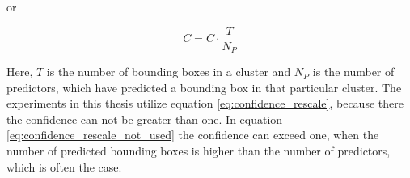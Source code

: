 \begin{enumerate}
    or

    \begin{equation}
        C = C \cdot \frac{T}{N_P}
        \label{eq:confidence_rescale_not_used}
    \end{equation}

    Here, $T$ is the number of bounding boxes in a cluster and $N_P$ is the number of predictors, which have predicted a bounding box in that particular cluster.
    The experiments in this thesis utilize equation \ref{eq:confidence_rescale}, because there the confidence can not be greater than one.
    In equation \ref{eq:confidence_rescale_not_used} the confidence can exceed one,  when the number of predicted bounding boxes is higher than the number of predictors, which is often the case.
\end{enumerate}
